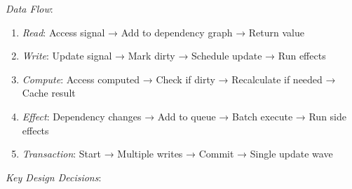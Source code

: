 \documentclass[11pt]{article}
\begin{document}
\emph{Data Flow}:

\begin{enumerate}
\item \emph{Read}: Access signal → Add to dependency graph → Return value
\item \emph{Write}: Update signal → Mark dirty → Schedule update → Run effects
\item \emph{Compute}: Access computed → Check if dirty → Recalculate if needed → Cache result
\item \emph{Effect}: Dependency changes → Add to queue → Batch execute → Run side effects
\item \emph{Transaction}: Start → Multiple writes → Commit → Single update wave
\end{enumerate}

\emph{Key Design Decisions}:
\end{document}
